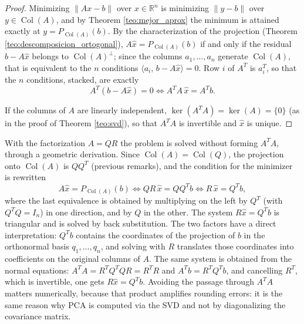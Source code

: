 \documentclass[11pt, a4paper]{article}
\begin{document}
\begin{proof}
Minimizing $\|Ax - b\|$ over $x \in \mathbb{R}^n$ is minimizing $\|y - b\|$ over $y \in \operatorname{Col}(A)$, and by Theorem \ref{teo:mejor_aprox} the minimum is attained exactly at $y = P_{\operatorname{Col}(A)}(b)$. By the characterization of the projection (Theorem \ref{teo:descomposicion_ortogonal}), $A\hat{x} = P_{\operatorname{Col}(A)}(b)$ if and only if the residual $b - A\hat{x}$ belongs to $\operatorname{Col}(A)^\perp$; since the columns $a_1, \dots, a_n$ generate $\operatorname{Col}(A)$, that is equivalent to the $n$ conditions $\langle a_i, \, b - A\hat{x} \rangle = 0$. Row $i$ of $A^T$ is $a_i^T$, so that the $n$ conditions, stacked, are exactly
\[
A^T (b - A\hat{x}) = 0 \iff A^T A \, \hat{x} = A^T b.
\]

If the columns of $A$ are linearly independent, $\ker(A^T A) = \ker(A) = \{0\}$ (as in the proof of Theorem \ref{teo:svd}), so that $A^T A$ is invertible and $\hat{x}$ is unique.
\end{proof}

\obs With the factorization $A = QR$ the problem is solved without forming $A^T A$, through a geometric derivation. Since $\operatorname{Col}(A) = \operatorname{Col}(Q)$, the projection onto $\operatorname{Col}(A)$ is $Q Q^T$ (previous remarks), and the condition for the minimizer is rewritten
\[
A \hat{x} = P_{\operatorname{Col}(A)}(b)
\iff Q R \, \hat{x} = Q Q^T b
\iff R \, \hat{x} = Q^T b,
\]
where the last equivalence is obtained by multiplying on the left by $Q^T$ (with $Q^T Q = I_n$) in one direction, and by $Q$ in the other. The system $R \hat{x} = Q^T b$ is triangular and is solved by back substitution. The two factors have a direct interpretation: $Q^T b$ contains the coordinates of the projection of $b$ in the orthonormal basis $q_1, \dots, q_n$, and solving with $R$ translates those coordinates into coefficients on the original columns of $A$. The same system is obtained from the normal equations: $A^T A = R^T Q^T Q R = R^T R$ and $A^T b = R^T Q^T b$, and cancelling $R^T$, which is invertible, one gets $R \hat{x} = Q^T b$. Avoiding the passage through $A^T A$ matters numerically, because that product amplifies rounding errors: it is the same reason why PCA is computed via the SVD and not by diagonalizing the covariance matrix.
\end{document}
